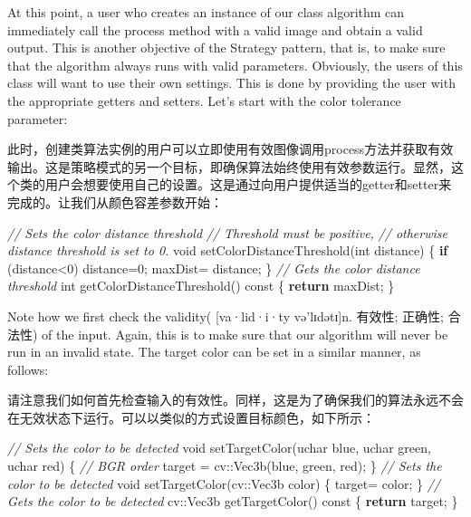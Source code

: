 \documentclass[]{article}
\newenvironment{Shaded}{}{}
\newcommand{\AttributeTok}[1]{\textcolor[rgb]{0.49,0.56,0.16}{#1}}
\newcommand{\CommentTok}[1]{\textcolor[rgb]{0.38,0.63,0.69}{\textit{#1}}}
\newcommand{\ControlFlowTok}[1]{\textcolor[rgb]{0.00,0.44,0.13}{\textbf{#1}}}
\newcommand{\DataTypeTok}[1]{\textcolor[rgb]{0.56,0.13,0.00}{#1}}
\newcommand{\DecValTok}[1]{\textcolor[rgb]{0.25,0.63,0.44}{#1}}
\newcommand{\ExtensionTok}[1]{#1}
\newcommand{\NormalTok}[1]{#1}
\begin{document}
At this point, a user who creates an instance of our class algorithm can
immediately call the process method with a valid image and obtain a
valid output. This is another objective of the Strategy pattern, that
is, to make sure that the algorithm always runs with valid parameters.
Obviously, the users of this class will want to use their own settings.
This is done by providing the user with the appropriate getters and
setters. Let's start with the color tolerance parameter:

此时，创建类算法实例的用户可以立即使用有效图像调用process方法并获取有效输出。这是策略模式的另一个目标，即确保算法始终使用有效参数运行。显然，这个类的用户会想要使用自己的设置。这是通过向用户提供适当的getter和setter来完成的。让我们从颜色容差参数开始：

\begin{Shaded}
\begin{Highlighting}[]
\CommentTok{// Sets the color distance threshold}
\CommentTok{// Threshold must be positive,}
\CommentTok{// otherwise distance threshold is set to 0.}
\DataTypeTok{void}\NormalTok{ setColorDistanceThreshold(}\DataTypeTok{int}\NormalTok{ distance) \{}
    \ControlFlowTok{if}\NormalTok{ (distance<}\DecValTok{0}\NormalTok{)}
\NormalTok{    	distance=}\DecValTok{0}\NormalTok{;}
\NormalTok{    maxDist= distance;}
\NormalTok{\}}
\CommentTok{// Gets the color distance threshold}
\DataTypeTok{int}\NormalTok{ getColorDistanceThreshold() }\AttributeTok{const}\NormalTok{ \{}
	\ControlFlowTok{return}\NormalTok{ maxDist;}
\NormalTok{\}}
\end{Highlighting}
\end{Shaded}

Note how we first check the validity( {[}va·lid·i·ty
\textbar{}\textbar{} və'lɪdətɪ{]}n. 有效性; 正确性; 合法性) of the
input. Again, this is to make sure that our algorithm will never be run
in an invalid state. The target color can be set in a similar manner, as
follows:

请注意我们如何首先检查输入的有效性。同样，这是为了确保我们的算法永远不会在无效状态下运行。可以以类似的方式设置目标颜色，如下所示：

\begin{Shaded}
\begin{Highlighting}[]
\CommentTok{// Sets the color to be detected}
\DataTypeTok{void}\NormalTok{ setTargetColor(}\ExtensionTok{uchar}\NormalTok{ blue, }\ExtensionTok{uchar}\NormalTok{ green, }\ExtensionTok{uchar}\NormalTok{ red) \{}
    \CommentTok{// BGR order}
\NormalTok{    target = cv::Vec3b(blue, green, red);}
\NormalTok{\}}
\CommentTok{// Sets the color to be detected}
\DataTypeTok{void}\NormalTok{ setTargetColor(cv::Vec3b color) \{}
\NormalTok{    target= color;}
\NormalTok{\}}
\CommentTok{// Gets the color to be detected}
\NormalTok{cv::Vec3b getTargetColor() }\AttributeTok{const}\NormalTok{ \{}
    \ControlFlowTok{return}\NormalTok{ target;}
\NormalTok{\}}
\end{Highlighting}
\end{Shaded}
\end{document}

